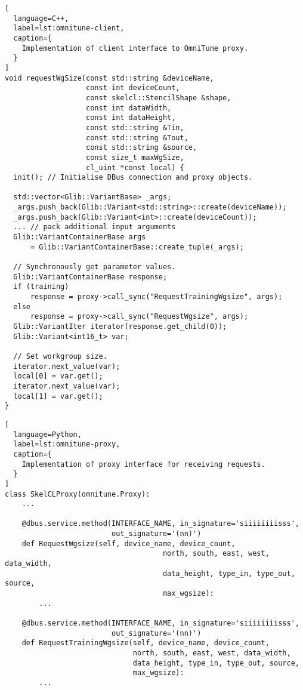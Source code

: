 \begin{lstlisting}[
  language=C++,
  label=lst:omnitune-client,
  caption={
    Implementation of client interface to OmniTune proxy.
  }
]
void requestWgSize(const std::string &deviceName,
                   const int deviceCount,
                   const skelcl::StencilShape &shape,
                   const int dataWidth,
                   const int dataHeight,
                   const std::string &Tin,
                   const std::string &Tout,
                   const std::string &source,
                   const size_t maxWgSize,
                   cl_uint *const local) {
  init(); // Initialise DBus connection and proxy objects.

  std::vector<Glib::VariantBase> _args;
  _args.push_back(Glib::Variant<std::string>::create(deviceName));
  _args.push_back(Glib::Variant<int>::create(deviceCount));
  ... // pack additional input arguments
  Glib::VariantContainerBase args
      = Glib::VariantContainerBase::create_tuple(_args);

  // Synchronously get parameter values.
  Glib::VariantContainerBase response;
  if (training)
      response = proxy->call_sync("RequestTrainingWgsize", args);
  else
      response = proxy->call_sync("RequestWgsize", args);
  Glib::VariantIter iterator(response.get_child(0));
  Glib::Variant<int16_t> var;

  // Set workgroup size.
  iterator.next_value(var);
  local[0] = var.get();
  iterator.next_value(var);
  local[1] = var.get();
}
\end{lstlisting}


\begin{lstlisting}[
  language=Python,
  label=lst:omnitune-proxy,
  caption={
    Implementation of proxy interface for receiving requests.
  }
]
class SkelCLProxy(omnitune.Proxy):
    ...

    @dbus.service.method(INTERFACE_NAME, in_signature='siiiiiiiisss',
                         out_signature='(nn)')
    def RequestWgsize(self, device_name, device_count,
                                     north, south, east, west, data_width,
                                     data_height, type_in, type_out, source,
                                     max_wgsize):
        ...

    @dbus.service.method(INTERFACE_NAME, in_signature='siiiiiiiisss',
                         out_signature='(nn)')
    def RequestTrainingWgsize(self, device_name, device_count,
                              north, south, east, west, data_width,
                              data_height, type_in, type_out, source,
                              max_wgsize):
        ...
\end{lstlisting}

